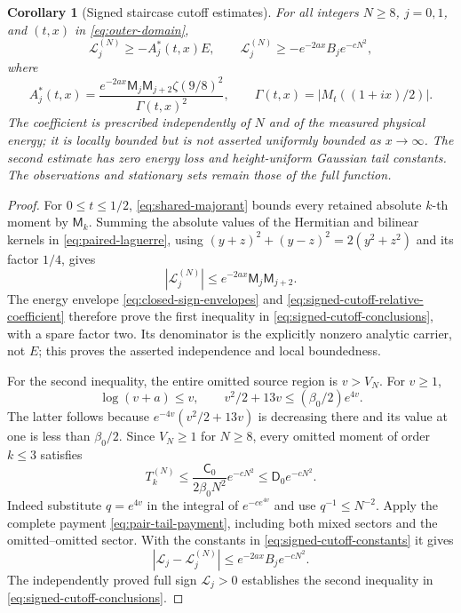 \documentclass[11pt]{article}
\numberwithin{equation}{section}
\newtheorem{corollary}[theorem]{Corollary}
\theoremstyle{definition}
\theoremstyle{remark}
\newcommand{\Lag}{\mathcal L}
\begin{document}
\begin{corollary}[Signed staircase cutoff estimates]
\label{cor:signed-staircase-cutoffs}
For all integers $N\ge8$, $j=0,1$, and $(t,x)$ in
\eqref{eq:outer-domain},
\begin{equation}
 \Lag_j^{(N)}\ge-A_j^*(t,x)E,
 \qquad
 \Lag_j^{(N)}\ge-e^{-2ax}B_j e^{-cN^2},
 \label{eq:signed-cutoff-conclusions}
\end{equation}
where
\begin{equation}
 A_j^*(t,x)=
 \frac{e^{-2ax}\mathsf M_j\mathsf M_{j+2}\zeta(9/8)^2}
      {\Gamma(t,x)^2},\qquad
 \Gamma(t,x)=|M_t((1+ix)/2)|.
 \label{eq:signed-cutoff-relative-coefficient}
\end{equation}
The coefficient is prescribed independently of $N$ and of the measured
physical energy; it is locally bounded but is not asserted uniformly
bounded as $x\to\infty$. The second estimate has zero energy loss and
height-uniform Gaussian tail constants. The observations and stationary
sets remain those of the full function.
\end{corollary}
\begin{proof}
For $0\le t\le1/2$, \eqref{eq:shared-majorant} bounds every retained
absolute $k$-th moment by $\mathsf M_k$. Summing the absolute values of
the Hermitian and bilinear kernels in \eqref{eq:paired-laguerre}, using
$(y+z)^2+(y-z)^2=2(y^2+z^2)$ and its factor $1/4$, gives
\begin{equation}
 |\Lag_j^{(N)}|\le
 e^{-2ax}\mathsf M_j\mathsf M_{j+2}.
 \label{eq:signed-cutoff-absolute}
\end{equation}
The energy envelope \eqref{eq:closed-sign-envelopes} and
\eqref{eq:signed-cutoff-relative-coefficient} therefore prove the first
inequality in \eqref{eq:signed-cutoff-conclusions}, with a spare factor
two. Its denominator is the explicitly nonzero analytic carrier, not
$E$; this proves the asserted independence and local boundedness.

For the second inequality, the entire omitted source region is
$v>V_N$. For $v\ge1$,
\[
 \log(v+a)\le v,\qquad
 v^2/2+13v\le(\beta_0/2)e^{4v}.
\]
The latter follows because $e^{-4v}(v^2/2+13v)$ is decreasing there
and its value at one is less than $\beta_0/2$. Since $V_N\ge1$ for
$N\ge8$, every omitted moment of order $k\le3$ satisfies
\begin{equation}
 T_k^{(N)}\le
 \frac{\mathsf C_0}{2\beta_0N^2}e^{-cN^2}
 \le\mathsf D_0e^{-cN^2}.
 \label{eq:signed-cutoff-tail-moments}
\end{equation}
Indeed substitute $q=e^{4v}$ in the integral of $e^{-ce^{4v}}$ and
use $q^{-1}\le N^{-2}$. Apply the complete payment
\eqref{eq:pair-tail-payment}, including both mixed sectors and the
omitted--omitted sector. With the constants in
\eqref{eq:signed-cutoff-constants} it gives
\begin{equation}
 |\Lag_j-\Lag_j^{(N)}|
 \le e^{-2ax}B_j e^{-cN^2}.
 \label{eq:signed-cutoff-complete-tail}
\end{equation}
The independently proved full sign $\Lag_j>0$ establishes the second
inequality in \eqref{eq:signed-cutoff-conclusions}.
\end{proof}
\end{document}
